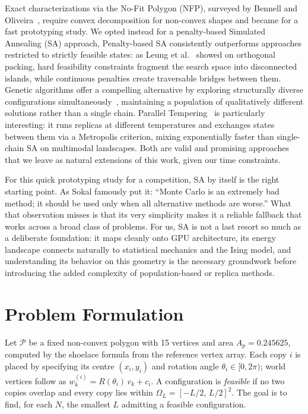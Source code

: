 \documentclass[10pt,twocolumn]{article}
\begin{document}
Exact characterizations via the No-Fit Polygon (NFP), surveyed by
Bennell and Oliveira~\cite{bennell2008}, require convex decomposition
for non-convex shapes and became for a fast prototyping study. We 
opted instead for a penalty-based Simulated Annealing (SA) approach,
Penalty-based SA consistently outperforms approaches restricted to
strictly feasible states: as Leung et al.~\cite{leung2003} showed on
orthogonal packing, hard feasibility constraints fragment the search
space into disconnected islands, while continuous penalties create
traversable bridges between them. Genetic algorithms offer a compelling
alternative by exploring structurally diverse configurations
simultaneously~\cite{burke2006}, maintaining a population of qualitatively
different solutions rather than a single chain. Parallel
Tempering~\cite{hukushima1996} is particularly interesting: it runs
replicas at different temperatures and exchanges states between them via
a Metropolis criterion, mixing exponentially faster than single-chain SA
on multimodal landscapes. Both are valid and promising approaches that
we leave as natural extensions of this work, given our time constraints.

For this quick prototyping study for a competition,
 SA by itself is the right starting point. As Sokal
famously put it: ``Monte Carlo is an extremely bad method; it should be
used only when all alternative methods are worse.'' What that observation
misses is that its very simplicity makes it a reliable fallback that
works across a broad class of problems.
For us, SA is not a last resort so much as a deliberate foundation: it
maps cleanly onto GPU architecture, its energy landscape connects
naturally to statistical mechanics and the Ising model, and understanding
its behavior on this geometry is the necessary groundwork before
introducing the added complexity of population-based or replica methods.

\section{Problem Formulation}
\label{sec:formulation}

Let $\mathcal{P}$ be a fixed non-convex polygon with 15 vertices and
area $A_p = 0.245625$, computed by the shoelace formula from the
reference vertex array. Each copy $i$ is placed by specifying its
centre $(x_i, y_i)$ and rotation angle $\theta_i \in [0, 2\pi)$;
world vertices follow as $w_k^{(i)} = R(\theta_i)\,v_k + c_i$. A
configuration is \emph{feasible} if no two copies overlap and every
copy lies within $\Omega_L = [-L/2,\,L/2]^2$. The goal is to find,
for each $N$, the smallest $L$ admitting a feasible configuration.
\end{document}
